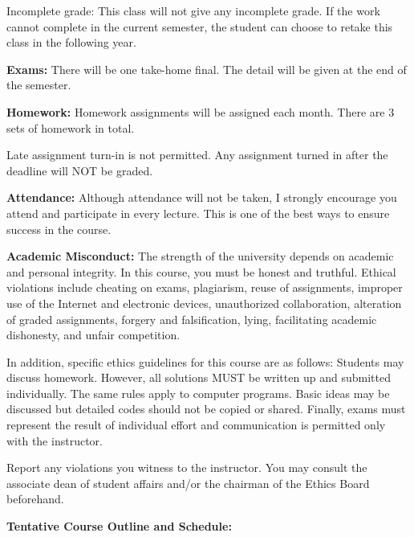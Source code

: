 \documentclass[a4paper,10pt]{article}
\begin{document}
Incomplete grade: This class will not give any
incomplete grade. If the work cannot complete in the
current semester, the student can choose to retake this
class in the following year.




\textbf{Exams:} There will be one take-home final. The detail will be given at the end of the semester. 


\textbf{Homework:} Homework assignments will be assigned each month. There are 3 sets of homework in total. 

Late assignment turn-in is not permitted. Any assignment turned in after the deadline will NOT be graded.




\textbf{Attendance:} Although attendance will not be taken, I strongly encourage you attend and participate in every lecture. This is one of the best ways to ensure success in the course.






\textbf{Academic Misconduct:} The strength of the university depends on academic and personal integrity. In this course, you must be honest 
and truthful. Ethical violations include cheating on exams, plagiarism, reuse of assignments, improper use 
of the Internet and electronic devices, unauthorized collaboration, alteration of graded assignments, forgery 
and falsification, lying, facilitating academic dishonesty, and unfair competition.

In addition, specific ethics guidelines for this course are as follows: Students may discuss homework. However, 
all solutions MUST be written up and submitted individually. The same rules apply to computer programs. 
Basic ideas may be discussed but detailed codes should not be copied or shared. Finally, exams must 
represent the result of individual effort and communication is permitted only with the instructor.

Report any violations you witness to the instructor. You may consult the associate dean of student affairs 
and/or the chairman of the Ethics Board beforehand. 

\textbf{Tentative Course Outline and Schedule:}
\end{document}
